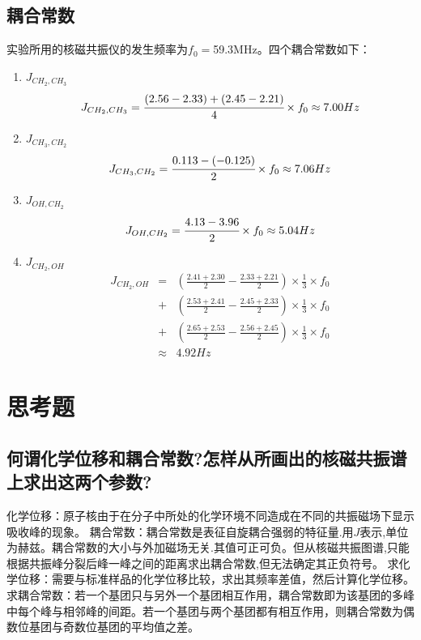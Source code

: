 \documentclass[a4paper]{article}
\begin{document}
\subsection{耦合常数}
实验所用的核磁共振仪的发生频率为$f_0 = $59.3MHz。四个耦合常数如下：
\begin{enumerate}
\item $J_{CH_2,CH_3}$\\
$$J_{CH_2,CH_3} = \cfrac{(2.56-2.33)+(2.45-2.21)}{4}\times f_0 \approx 7.00Hz$$
\item $J_{CH_3,CH_2}$\\
$$J_{CH_3,CH_2} = \cfrac{0.113 - (-0.125)}{2}\times f_0 \approx 7.06Hz$$
\item $J_{OH,CH_2}$\\
$$J_{OH,CH_2} = \cfrac{4.13 - 3.96}{2}\times f_0 \approx 5.04Hz$$
\item $J_{CH_2,OH}$\\
\begin{eqnarray*}
J_{CH_2,OH} &=&
   \left(\frac{2.41+2.30}{2} - \frac{2.33+2.21}{2}\right)\times\frac13\times f_0  \\
 &+& \left(\frac{2.53+2.41}{2} - \frac{2.45+2.33}{2}\right)\times\frac13\times f_0  \\
 &+& \left(\frac{2.65+2.53}{2} - \frac{2.56+2.45}{2}\right)\times\frac13\times f_0 \\
 &\approx& 4.92Hz
\end{eqnarray*}
\end{enumerate}

\section{思考题}
\subsection{何谓化学位移和耦合常数?怎样从所画出的核磁共振谱上求出这两个参数?}
化学位移：原子核由于在分子中所处的化学环境不同造成在不同的共振磁场下显示吸收峰的现象。
耦合常数：耦合常数是表征自旋耦合强弱的特征量.用$J$表示,单位为赫兹。耦合常数的大小与外加磁场无关.其值可正可负。但从核磁共振图谱,只能根据共振峰分裂后峰一峰之间的距离求出耦合常数,但无法确定其正负符号。
求化学位移：需要与标准样品的化学位移比较，求出其频率差值，然后计算化学位移。
求耦合常数：若一个基团只与另外一个基团相互作用，耦合常数即为该基团的多峰中每个峰与相邻峰的间距。若一个基团与两个基团都有相互作用，则耦合常数为偶数位基团与奇数位基团的平均值之差。
\end{document}
